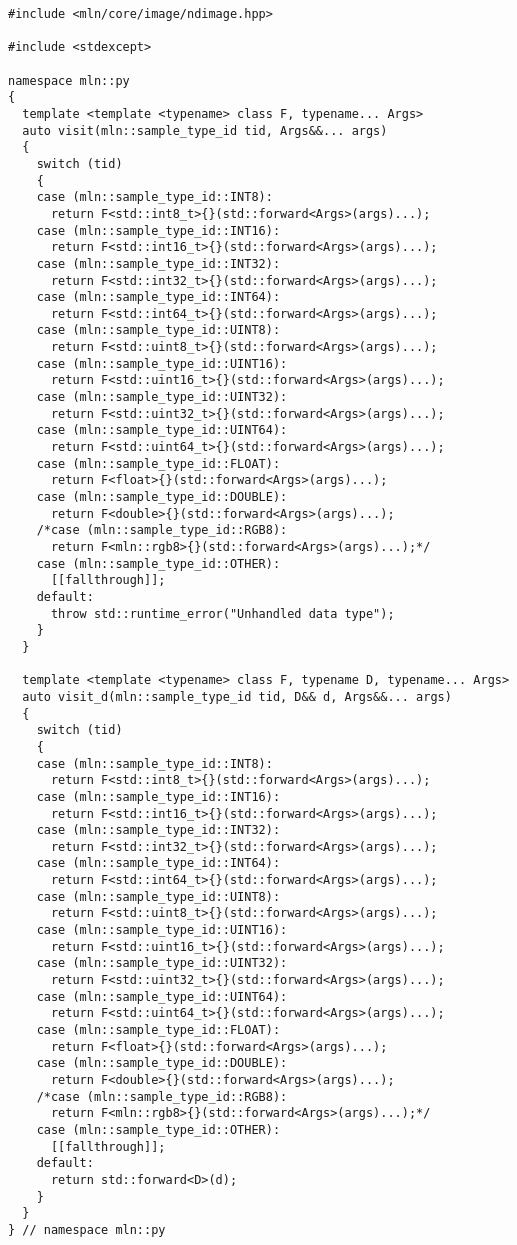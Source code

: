 \begin{verbatim}
#include <mln/core/image/ndimage.hpp>

#include <stdexcept>

namespace mln::py
{
  template <template <typename> class F, typename... Args>
  auto visit(mln::sample_type_id tid, Args&&... args)
  {
    switch (tid)
    {
    case (mln::sample_type_id::INT8):
      return F<std::int8_t>{}(std::forward<Args>(args)...);
    case (mln::sample_type_id::INT16):
      return F<std::int16_t>{}(std::forward<Args>(args)...);
    case (mln::sample_type_id::INT32):
      return F<std::int32_t>{}(std::forward<Args>(args)...);
    case (mln::sample_type_id::INT64):
      return F<std::int64_t>{}(std::forward<Args>(args)...);
    case (mln::sample_type_id::UINT8):
      return F<std::uint8_t>{}(std::forward<Args>(args)...);
    case (mln::sample_type_id::UINT16):
      return F<std::uint16_t>{}(std::forward<Args>(args)...);
    case (mln::sample_type_id::UINT32):
      return F<std::uint32_t>{}(std::forward<Args>(args)...);
    case (mln::sample_type_id::UINT64):
      return F<std::uint64_t>{}(std::forward<Args>(args)...);
    case (mln::sample_type_id::FLOAT):
      return F<float>{}(std::forward<Args>(args)...);
    case (mln::sample_type_id::DOUBLE):
      return F<double>{}(std::forward<Args>(args)...);
    /*case (mln::sample_type_id::RGB8):
      return F<mln::rgb8>{}(std::forward<Args>(args)...);*/
    case (mln::sample_type_id::OTHER):
      [[fallthrough]];
    default:
      throw std::runtime_error("Unhandled data type");
    }
  }

  template <template <typename> class F, typename D, typename... Args>
  auto visit_d(mln::sample_type_id tid, D&& d, Args&&... args)
  {
    switch (tid)
    {
    case (mln::sample_type_id::INT8):
      return F<std::int8_t>{}(std::forward<Args>(args)...);
    case (mln::sample_type_id::INT16):
      return F<std::int16_t>{}(std::forward<Args>(args)...);
    case (mln::sample_type_id::INT32):
      return F<std::int32_t>{}(std::forward<Args>(args)...);
    case (mln::sample_type_id::INT64):
      return F<std::int64_t>{}(std::forward<Args>(args)...);
    case (mln::sample_type_id::UINT8):
      return F<std::uint8_t>{}(std::forward<Args>(args)...);
    case (mln::sample_type_id::UINT16):
      return F<std::uint16_t>{}(std::forward<Args>(args)...);
    case (mln::sample_type_id::UINT32):
      return F<std::uint32_t>{}(std::forward<Args>(args)...);
    case (mln::sample_type_id::UINT64):
      return F<std::uint64_t>{}(std::forward<Args>(args)...);
    case (mln::sample_type_id::FLOAT):
      return F<float>{}(std::forward<Args>(args)...);
    case (mln::sample_type_id::DOUBLE):
      return F<double>{}(std::forward<Args>(args)...);
    /*case (mln::sample_type_id::RGB8):
      return F<mln::rgb8>{}(std::forward<Args>(args)...);*/
    case (mln::sample_type_id::OTHER):
      [[fallthrough]];
    default:
      return std::forward<D>(d);
    }
  }
} // namespace mln::py
\end{verbatim}


